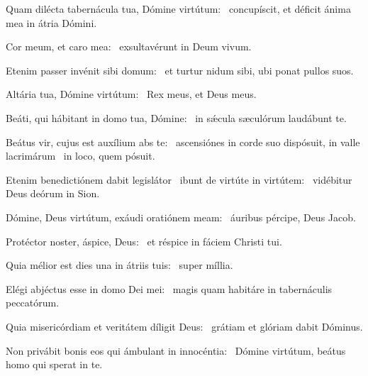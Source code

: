 \item Quam dilécta tabernácula tua, Dómine virtútum:~\psstar{} concupíscit, et déficit ánima mea in átria Dómini.

\item Cor meum, et caro mea:~\psstar{} exsultavérunt in Deum vivum.

\item Etenim passer invénit sibi domum:~\psstar{} et turtur nidum sibi, ubi ponat pullos suos.

\item Altária tua, Dómine virtú\-tum:~\psstar{} Rex meus, et Deus meus.

\item Beáti, qui hábitant in domo tua, Dómine:~\psstar{} in sǽcula sæculórum laudábunt te.

\item Beátus vir, cujus est auxílium abs te:~\pscross{} ascensiónes in corde suo dispósuit, in valle lacrimárum~\psstar{} in loco, quem pósuit.

\item Etenim benedictiónem dabit legislátor~\pscross{} ibunt de virtúte in virtútem:~\psstar{} vidébitur Deus deórum in Sion.

\item Dómine, Deus virtútum, exáudi oratiónem meam:~\psstar{} áuribus pércipe, Deus Jacob.

\item Protéctor noster, áspice, Deus:~\psstar{} et réspice in fáciem Christi tui.

\item Quia mélior est dies una in átriis tuis:~\psstar{} super míllia.

\item Elégi abjéctus esse in domo Dei mei:~\psstar{} magis quam habitáre in tabernáculis peccatórum.

\item Quia misericórdiam et veritátem díligit Deus:~\psstar{} grátiam et glóriam dabit Dóminus.

\item Non privábit bonis eos qui ámbulant in innocéntia:~\psstar{} Dómine virtútum, beátus homo qui sperat in te.
